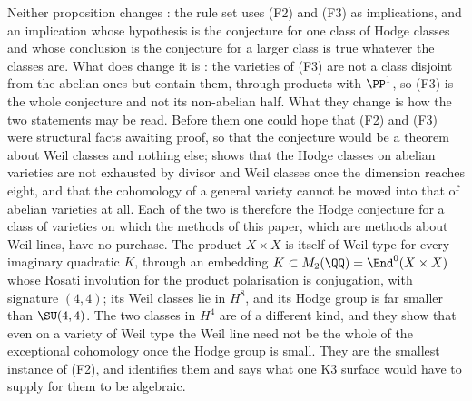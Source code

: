 \begin{remark}
\label{rem:notreductions}
Neither proposition changes : the rule set uses (F2) and
(F3) as implications, and an implication whose hypothesis is the conjecture
for one class of Hodge classes and whose conclusion is the conjecture for a
larger class is true whatever the classes are. What does change it is
: the varieties of (F3) are not a class disjoint from the
abelian ones but contain them, through products with $\PP^{1}$, so (F3) is
the whole conjecture and not its non-abelian half. What they change is how the
two statements may be read. Before them one could hope that (F2) and (F3) were
structural facts awaiting proof, so that the conjecture would be a theorem
about Weil classes and nothing else;  shows that the
Hodge classes on abelian varieties are not exhausted by divisor and Weil
classes once the dimension reaches eight, and  that
the cohomology of a general variety cannot be moved into that of abelian
varieties at all. Each of the two is therefore the Hodge conjecture for a class
of varieties on which the methods of this paper, which are methods about Weil
lines, have no purchase. The product $X\times X$ is itself of
Weil type for every imaginary quadratic $K$, through an embedding
$K\subset M_{2}(\QQ)=\End^{0}(X\times X)$ whose Rosati involution for the
product polarisation is conjugation, with signature $(4,4)$; its Weil classes
lie in $H^{8}$, and its Hodge group is far smaller than $\SU(4,4)$. The two
classes in $H^{4}$ are of a different kind, and they show that even on a
variety of Weil type the Weil line need not be the whole of the exceptional
cohomology once the Hodge group is small. They are the smallest instance of
(F2), and  identifies them and says what one K3 surface
would have to supply for them to be algebraic.
\end{remark}

